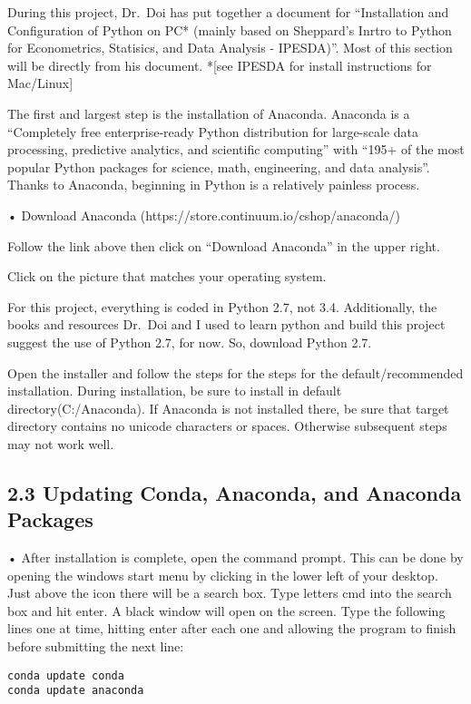\documentclass{article}
\begin{document}
    During this project, Dr.~Doi has put together a document for
``Installation and Configuration of Python on PC* (mainly based on
Sheppard's Inrtro to Python for Econometrics, Statisics, and Data
Analysis - IPESDA)''. Most of this section will be directly from his
document. *{[}see IPESDA for install instructions for Mac/Linux{]}

The first and largest step is the installation of Anaconda. Anaconda is
a ``Completely free enterprise-ready Python distribution for large-scale
data processing, predictive analytics, and scientific computing'' with
``195+ of the most popular Python packages for science, math,
engineering, and data analysis''. Thanks to Anaconda, beginning in
Python is a relatively painless process.

    • Download Anaconda (https://store.continuum.io/cshop/anaconda/)

Follow the link above then click on ``Download Anaconda'' in the upper
right.

Click on the picture that matches your operating system.

For this project, everything is coded in Python 2.7, not 3.4.
Additionally, the books and resources Dr.~Doi and I used to learn python
and build this project suggest the use of Python 2.7, for now. So,
download Python 2.7.

Open the installer and follow the steps for the steps for the
default/recommended installation. During installation, be sure to
install in default directory(C:/Anaconda). If Anaconda is not installed
there, be sure that target directory contains no unicode characters or
spaces. Otherwise subsequent steps may not work well. 


    \subsection{2.3 Updating Conda, Anaconda, and Anaconda Packages}


    • After installation is complete, open the command prompt. This can be
done by opening the windows start menu by clicking in the lower left of
your desktop. Just above the icon there will be a search box. Type
letters cmd into the search box and hit enter. A black window will open
on the screen. Type the following lines one at time, hitting enter after
each one and allowing the program to finish before submitting the next
line:

\begin{verbatim}
conda update conda
conda update anaconda
\end{verbatim}
\end{document}

